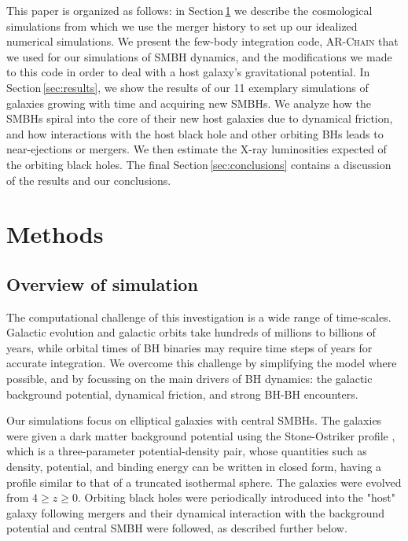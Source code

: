 \documentclass[fleqn,usenatbib,useAMS]{mnras}
\begin{document}
This paper is organized as follows: in Section\,\ref{sec:methods} we describe the cosmological simulations from which we use the merger history to set up our idealized numerical simulations. We present the few-body integration code, \textsc{AR-Chain} that we used for our simulations of SMBH dynamics, and the modifications we made to this code in order to deal with a host galaxy's gravitational potential. In Section\,\ref{sec:results}, we show the results of our 11 exemplary simulations of galaxies growing with time and acquiring new SMBHs. We analyze how the SMBHs spiral into the core of their new host galaxies due to dynamical friction, and how interactions with the host black hole and other orbiting BHs leads to near-ejections or mergers. We then estimate the X-ray luminosities expected of the orbiting black holes.  The final Section\,\ref{sec:conclusions} contains a discussion of the results and our conclusions.

\section{Methods}\label{sec:methods}

\subsection{Overview of simulation}
The computational challenge of this investigation is a wide range of time-scales. Galactic evolution and galactic orbits take hundreds of millions to billions of years, while orbital times of BH binaries may require time steps of years for accurate integration. We overcome this challenge by simplifying the model where possible, and by focussing on the main drivers of BH dynamics: the galactic background potential, dynamical friction, and strong BH-BH encounters.

Our simulations focus on elliptical galaxies with central SMBHs. The galaxies were given a dark matter background potential using the Stone-Ostriker profile \citep{2015ApJ...806L..28S}, which is a three-parameter potential-density pair, whose quantities such as density, potential, and binding energy can be written in closed form, having a profile similar to that of a truncated isothermal sphere.  The galaxies were evolved from $4\geq z \geq 0$.  Orbiting black holes were periodically introduced into the "host" galaxy following mergers and their dynamical interaction with the background potential and central SMBH were followed, as described further below.
\end{document}
